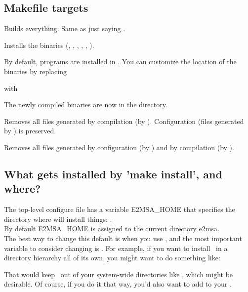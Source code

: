 \subsection{Makefile targets}

\begin{sreitems}{}

\item[\emprog{all}]
  Builds everything. Same as just saying .

\item[\emprog{install}] 
  Installs the binaries (, , , ,  , ).

  By default, programs are installed in
  . 
  You can customize the location of the binaries by replacing
  
  
  with
  
  
  The newly compiled binaries are now in the
   directory.\\
  
\item[\emprog{clean}]
  Removes all files generated by compilation (by
  ). Configuration (files generated by
  ) is preserved.

\item[\emprog{distclean}]
  Removes all files generated by configuration (by )
  and by compilation (by ). 

\end{sreitems}


\subsection{What gets installed by 'make install', and where?}

The top-level configure file has a variable E2MSA\_HOME that
specifies the directory where  will install
things: .\\

By default E2MSA\_HOME is assigned to the current directory
e2msa.\\

The best way to change this default is when you use
, and the most important variable to consider
changing is . For example, if you want to install
\etwomsa\ in a directory hierarchy all of its own, you might want to do
something like:


That would keep \etwomsa\ out of your system-wide directories like
, which might be desirable. Of course, if you do
it that way, you'd also want to add  to
your .
